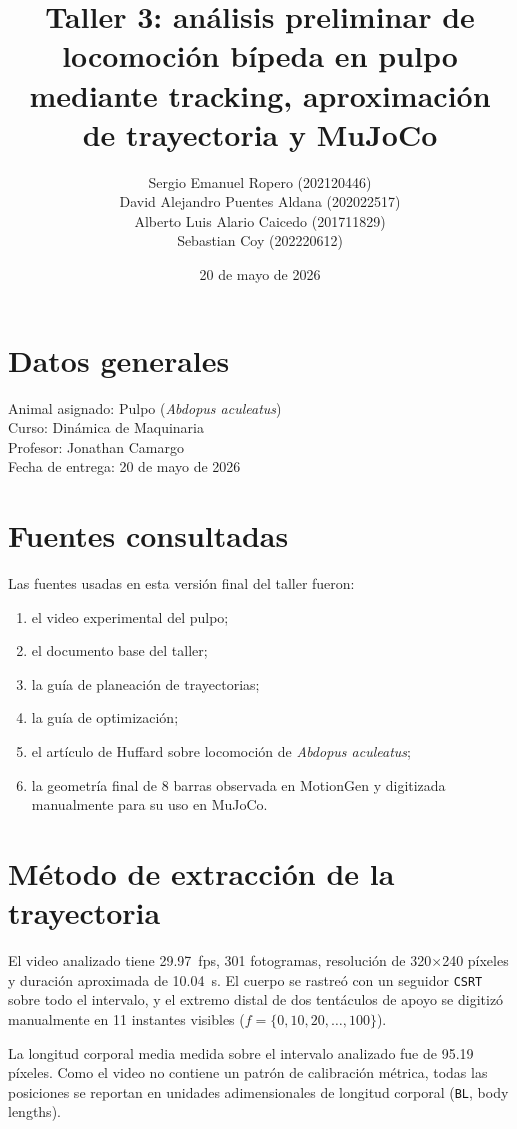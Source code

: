 \documentclass[11pt]{article}
\title{Taller 3: análisis preliminar de locomoción bípeda en pulpo mediante tracking, aproximación de trayectoria y MuJoCo}
\author{
Sergio Emanuel Ropero (202120446) \\
David Alejandro Puentes Aldana (202022517) \\
Alberto Luis Alario Caicedo (201711829) \\
Sebastian Coy (202220612)
}
\date{20 de mayo de 2026}
\begin{document}
\maketitle

\section*{Datos generales}
Animal asignado: Pulpo (\textit{Abdopus aculeatus}) \\
Curso: Dinámica de Maquinaria \\
Profesor: Jonathan Camargo \\
Fecha de entrega: 20 de mayo de 2026

\section*{Fuentes consultadas}
Las fuentes usadas en esta versión final del taller fueron:
\begin{enumerate}[leftmargin=1.6em]
\item el video experimental del pulpo;
\item el documento base del taller;
\item la guía de planeación de trayectorias;
\item la guía de optimización;
\item el artículo de Huffard sobre locomoción de \textit{Abdopus aculeatus};
\item la geometría final de 8 barras observada en MotionGen y digitizada manualmente para su uso en MuJoCo.
\end{enumerate}

\section*{Método de extracción de la trayectoria}
El video analizado tiene \SI{29.97}{fps}, \num{301} fotogramas, resolución de \num{320}$\times$\num{240} píxeles y duración aproximada de \SI{10.04}{s}. El cuerpo se rastreó con un seguidor \texttt{CSRT} sobre todo el intervalo, y el extremo distal de dos tentáculos de apoyo se digitizó manualmente en \num{11} instantes visibles (\(f=\{0,10,20,\dots,100\}\)).

La longitud corporal media medida sobre el intervalo analizado fue de \num{95.19} píxeles. Como el video no contiene un patrón de calibración métrica, todas las posiciones se reportan en unidades adimensionales de longitud corporal (\texttt{BL}, body lengths).
\end{document}
